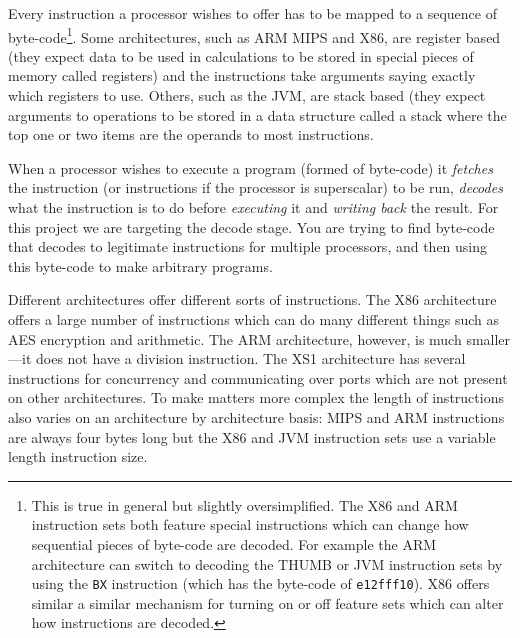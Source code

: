 \documentclass[10pt]{book}
\begin{document}
Every instruction a processor wishes to offer has to be mapped to a
sequence of byte-code\footnote{This is true in general but slightly
  oversimplified. The X86 and ARM instruction sets both feature special
  instructions which can change how sequential pieces of byte-code are
  decoded. For example the ARM architecture\autocite{Seal:2000vd} can
  switch to decoding the THUMB or JVM instruction sets by using the
  \lstinline!BX! instruction (which has the byte-code of
  \lstinline!e12fff10!). X86\autocite{IntelCorporation:1997ta} offers
  similar a similar mechanism for turning on or off feature sets which
  can alter how instructions are decoded.}. Some architectures, such as
ARM\autocite{Seal:2000vd} MIPS\autocite{MIPSTechnologiesInc:2011ta} and
X86\autocite{IntelCorporation:1997ta}, are register based (they expect
data to be used in calculations to be stored in special pieces of memory
called registers) and the instructions take arguments saying exactly
which registers to use. Others, such as the
JVM\autocite{Lindholm:2012wy}, are stack based (they expect arguments to
operations to be stored in a data structure called a stack where the top
one or two items are the operands to most instructions.

When a processor wishes to execute a program (formed of byte-code) it
\emph{fetches} the instruction (or instructions if the processor is
superscalar) to be run, \emph{decodes} what the instruction is to do
before \emph{executing} it and \emph{writing back} the result. For this
project we are targeting the decode stage. You are trying to find
byte-code that decodes to legitimate instructions for multiple
processors, and then using this byte-code to make arbitrary programs.

Different architectures offer different sorts of instructions. The X86
architecture offers a large number of instructions which can do many
different things such as AES encryption and arithmetic\autocite{refx86}.
The ARM architecture\autocite{Seal:2000vd}, however, is much
smaller---it does not have a division instruction. The XS1
architecture\autocite{May:ua} has several instructions for concurrency
and communicating over ports which are not present on other
architectures. To make matters more complex the length of instructions
also varies on an architecture by architecture basis: MIPS and ARM
instructions are always four bytes long but the X86 and JVM instruction
sets use a variable length instruction size.
\end{document}
